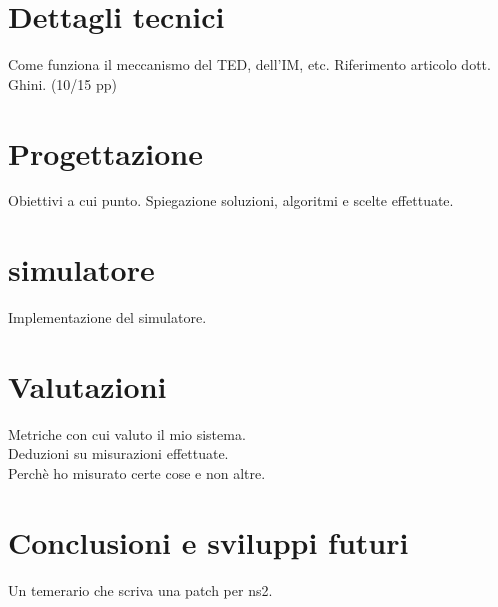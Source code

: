 \documentclass[12pt,a4paper,openright,twoside]{book}
\begin{document}
\chapter{Dettagli tecnici}

	Come funziona il meccanismo del TED, dell'IM, etc. Riferimento articolo
	dott. Ghini. (10/15 pp)

\chapter{Progettazione}

	Obiettivi a cui punto. Spiegazione soluzioni, algoritmi e scelte effettuate.

\chapter{simulatore}

	Implementazione del simulatore.

\chapter{Valutazioni}

	Metriche con cui valuto il mio sistema.\\
	Deduzioni su misurazioni effettuate.\\
	Perchè ho misurato certe cose e non altre.

\chapter{Conclusioni e sviluppi futuri}

	Un temerario che scriva una patch per ns2.
\end{document}
